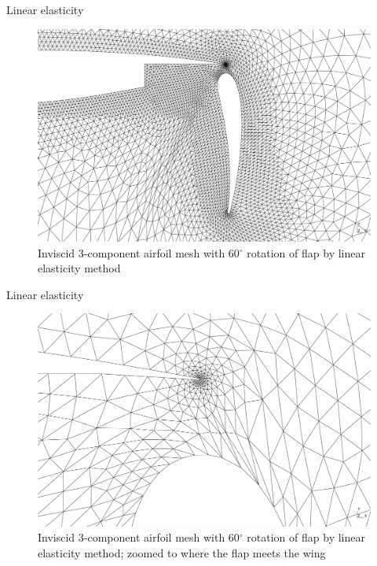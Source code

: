 \documentclass[t,12pt]{beamer}
\begin{document}
\begin{frame}{Linear elasticity}
	\begin{figure}[!h]
		\centering
		\includegraphics[scale=0.17]{wing60-linelastp1}
		\caption{Inviscid 3-component airfoil mesh with 60$^\circ$ rotation of flap by linear elasticity method}
		\label{fig:wing-inviscid-linelastp1}
	\end{figure}
\end{frame}
\begin{frame}{Linear elasticity}
	\begin{figure}[!h]
		\centering
		\includegraphics[scale=0.17]{wing60-linelastp1_zoomed}
		\caption{Inviscid 3-component airfoil mesh with 60$^\circ$ rotation of flap by linear elasticity method; zoomed to where the flap meets the wing}
		\label{fig:wing-inviscid-linelastp1-zoomed}
	\end{figure}
\end{frame}
\end{document}
